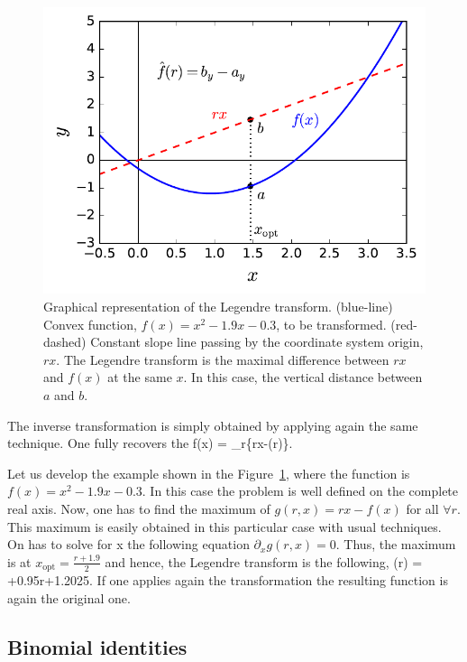 \begin{figure}[htp]
  \centering
  \includegraphics[scale=.65]{img/plots/LT_legendre.pdf}
  \caption[Graphical representation of the Legendre trasnform.]{Graphical representation of the Legendre transform. (blue-line) Convex function, $f(x)=x^2-1.9x-0.3$, to be transformed. (red-dashed) Constant slope line passing by the coordinate system origin, $rx$. The Legendre transform is the maximal difference between $rx$ and $f(x)$ at the same $x$. In this case, the vertical distance between $a$ and $b$.}
  \label{fig:lt-geometric-legendre}
\end{figure}

The inverse transformation is simply obtained by applying again the same technique.
One fully recovers the
\be
  f(x) = \max_{r}\{rx-(r)\}.
\ee

Let us develop the example shown in the Figure~\ref{fig:lt-geometric-legendre}, where the function is $f(x)=x^2-1.9x-0.3$.
In this case the problem is well defined on the complete real axis.
Now, one has to find the maximum of $g(r,x)=rx-f(x)$ for all $\forall r$.
This maximum is easily obtained in this particular case with usual techniques.
On has to solve for x the following equation $\partial_x g(r,x) = 0$. Thus, the maximum is at $x_{\text{opt}} = \frac{r+1.9}{2}$ and hence, the Legendre transform is the following,
\be
  (r) = +0.95r+1.2025.
\ee
If one applies again the transformation the resulting function is again the original one.

\subsection{Binomial identities}
\label{app:binomial-identities}
